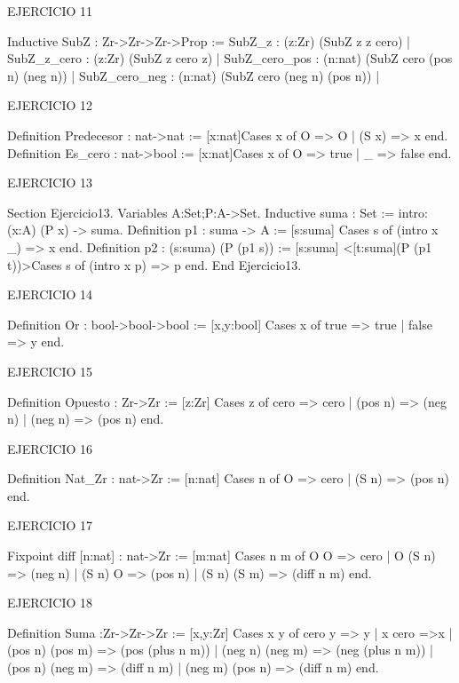 \documentclass[11pt]{article}
\begin{document}
EJERCICIO 11
\begin{coq_example}
Inductive SubZ : Zr->Zr->Zr->Prop := SubZ_z : (z:Zr) (SubZ z z cero) | SubZ_z_cero : (z:Zr) (SubZ z cero z) | SubZ_cero_pos : (n:nat) (SubZ cero (pos n) (neg n)) | SubZ_cero_neg : (n:nat) (SubZ cero (neg n) (pos n)) | 
\end{coq_example}

EJERCICIO 12
\begin{coq_example}
Definition Predecesor : nat->nat := [x:nat]Cases x of O => O | (S x) => x end.
Definition Es_cero : nat->bool := [x:nat]Cases x of O => true | _ => false end.
\end{coq_example}

EJERCICIO 13
\begin{coq_example}
Section Ejercicio13.
Variables A:Set;P:A->Set.
Inductive suma : Set := intro: (x:A) (P x) -> suma.
Definition p1 : suma -> A := [s:suma] Cases s of (intro x _) => x end.
Definition p2 : (s:suma) (P (p1 s)) := [s:suma] <[t:suma](P (p1 t))>Cases s of (intro x p) => p end.
End Ejercicio13.
\end{coq_example}

EJERCICIO 14
\begin{coq_example}
Definition Or : bool->bool->bool := [x,y:bool] Cases x of true => true | false => y end.
\end{coq_example}

EJERCICIO 15
\begin{coq_example}
Definition Opuesto : Zr->Zr := [z:Zr] Cases z of cero => cero | (pos n) => (neg n) | (neg n) => (pos n) end.
\end{coq_example}

EJERCICIO 16
\begin{coq_example}
Definition Nat_Zr : nat->Zr := [n:nat] Cases n of O => cero | (S n) => (pos n) end.
\end{coq_example}

EJERCICIO 17
\begin{coq_example}
Fixpoint diff [n:nat] : nat->Zr := [m:nat] Cases n m of O O => cero | O (S n) => (neg n) | (S n) O => (pos n) | (S n) (S m) => (diff n m) end.
\end{coq_example}

EJERCICIO 18
\begin{coq_example}
Definition Suma :Zr->Zr->Zr := [x,y:Zr] Cases x y of cero y => y | x cero =>x | (pos n) (pos m) => (pos (plus n m)) | (neg n) (neg m) => (neg (plus n m)) | (pos n) (neg m) => (diff n m) | (neg m) (pos n) => (diff n m) end.
\end{coq_example}
\end{document}
